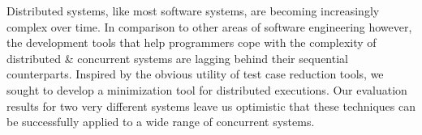 Distributed systems, like most software systems, are becoming increasingly complex over time.
In comparison to other areas of software engineering however, the development
tools that help programmers cope with the complexity of distributed \&
concurrent systems are lagging behind their sequential counterparts.
Inspired by the obvious utility of test case reduction tools, we sought to develop a
minimization tool for distributed executions. Our evaluation results for two
very different systems leave us optimistic that these techniques can be
successfully applied to a wide range of concurrent systems.

